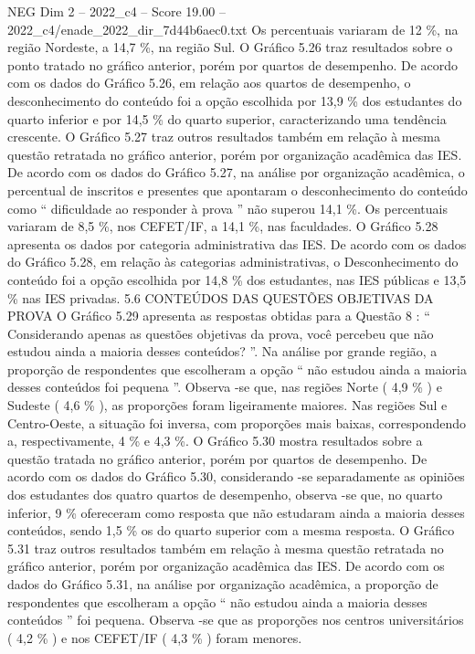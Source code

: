 \begin{textsample}{NEG Dim 2 – 2022\_c4 – Score 19.00 – 2022\_c4/enade\_2022\_dir\_7d44b6aec0.txt}
Os percentuais variaram de 12 \%, na região Nordeste, a 14,7 \%, na região Sul.
O Gráfico 5.26 traz resultados sobre o ponto tratado no gráfico anterior, porém por quartos de desempenho.
De acordo com os dados do Gráfico 5.26, em relação aos quartos de desempenho, o desconhecimento do conteúdo foi a opção escolhida por 13,9 \% dos estudantes do quarto inferior e por 14,5 \% do quarto superior, caracterizando uma tendência crescente.
O Gráfico 5.27 traz outros resultados também em relação à mesma questão retratada no gráfico anterior, porém por organização acadêmica das IES.
De acordo com os dados do Gráfico 5.27, na análise por organização acadêmica, o percentual de inscritos e presentes que apontaram o desconhecimento do conteúdo como “ dificuldade ao responder à prova ” não superou 14,1 \%.
Os percentuais variaram de 8,5 \%, nos CEFET/IF, a 14,1 \%, nas faculdades.
O Gráfico 5.28 apresenta os dados por categoria administrativa das IES.
De acordo com os dados do Gráfico 5.28, em relação às categorias administrativas, o Desconhecimento do conteúdo foi a opção escolhida por 14,8 \% dos estudantes, nas IES públicas e 13,5 \% nas IES privadas. 5.6 CONTEÚDOS DAS QUESTÕES OBJETIVAS DA PROVA O Gráfico 5.29 apresenta as respostas obtidas para a Questão 8 : “ Considerando apenas as questões objetivas da prova, você percebeu que não estudou ainda a maioria desses conteúdos? ”.
Na análise por grande região, a proporção de respondentes que escolheram a opção “ não estudou ainda a maioria desses conteúdos foi pequena ”.
Observa -se que, nas regiões Norte ( 4,9 \% ) e Sudeste ( 4,6 \% ), as proporções foram ligeiramente maiores.
Nas regiões Sul e Centro-Oeste, a situação foi inversa, com proporções mais baixas, correspondendo a, respectivamente, 4 \% e 4,3 \%.
O Gráfico 5.30 mostra resultados sobre a questão tratada no gráfico anterior, porém por quartos de desempenho.
De acordo com os dados do Gráfico 5.30, considerando -se separadamente as opiniões dos estudantes dos quatro quartos de desempenho, observa -se que, no quarto inferior, 9 \% ofereceram como resposta que não estudaram ainda a maioria desses conteúdos, sendo 1,5 \% os do quarto superior com a mesma resposta.
O Gráfico 5.31 traz outros resultados também em relação à mesma questão retratada no gráfico anterior, porém por organização acadêmica das IES.
De acordo com os dados do Gráfico 5.31, na análise por organização acadêmica, a proporção de respondentes que escolheram a opção “ não estudou ainda a maioria desses conteúdos ” foi pequena.
Observa -se que as proporções nos centros universitários ( 4,2 \% ) e nos CEFET/IF ( 4,3 \% ) foram menores.

\end{textsample}
